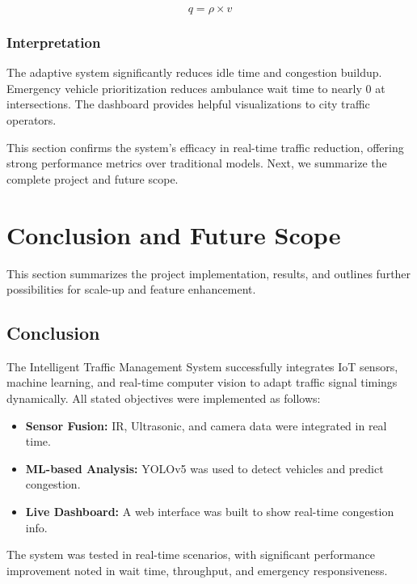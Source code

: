 \documentclass[12pt]{report}
\begin{document}
\begin{equation}
q = \rho \times v
\label{eqn:flow}
\end{equation}

\subsection{Interpretation}
The adaptive system significantly reduces idle time and congestion buildup. Emergency vehicle prioritization reduces ambulance wait time to nearly 0 at intersections. The dashboard provides helpful visualizations to city traffic operators.

\vspace{0.5cm}

This section confirms the system’s efficacy in real-time traffic reduction, offering strong performance metrics over traditional models. Next, we summarize the complete project and future scope.

\chapter{Conclusion and Future Scope}

This section summarizes the project implementation, results, and outlines further possibilities for scale-up and feature enhancement.

\section{Conclusion}
The Intelligent Traffic Management System successfully integrates IoT sensors, machine learning, and real-time computer vision to adapt traffic signal timings dynamically. All stated objectives were implemented as follows:
\begin{itemize}
\item \textbf{Sensor Fusion:} IR, Ultrasonic, and camera data were integrated in real time.
\item \textbf{ML-based Analysis:} YOLOv5 was used to detect vehicles and predict congestion.
\item \textbf{Live Dashboard:} A web interface was built to show real-time congestion info.
\end{itemize}

The system was tested in real-time scenarios, with significant performance improvement noted in wait time, throughput, and emergency responsiveness.
\end{document}

